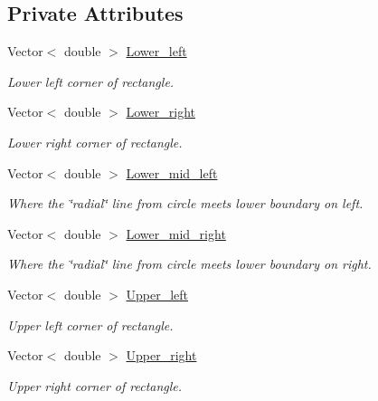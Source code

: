 \subsection*{Private Attributes}
\begin{DoxyCompactItemize}
\item 
Vector$<$ double $>$ \hyperlink{classoomph_1_1RectangleWithHoleDomain_a6926164244a3726aa904023c014e2cf0}{Lower\+\_\+left}
\begin{DoxyCompactList}\small\item\em Lower left corner of rectangle. \end{DoxyCompactList}\item 
Vector$<$ double $>$ \hyperlink{classoomph_1_1RectangleWithHoleDomain_ab71febd980c61d0c2ba0a76eca053a97}{Lower\+\_\+right}
\begin{DoxyCompactList}\small\item\em Lower right corner of rectangle. \end{DoxyCompactList}\item 
Vector$<$ double $>$ \hyperlink{classoomph_1_1RectangleWithHoleDomain_aa643600f8269e6037a76832dd0fba0f9}{Lower\+\_\+mid\+\_\+left}
\begin{DoxyCompactList}\small\item\em Where the \char`\"{}radial\char`\"{} line from circle meets lower boundary on left. \end{DoxyCompactList}\item 
Vector$<$ double $>$ \hyperlink{classoomph_1_1RectangleWithHoleDomain_a9ef86489e71e2f67eec783b460694be2}{Lower\+\_\+mid\+\_\+right}
\begin{DoxyCompactList}\small\item\em Where the \char`\"{}radial\char`\"{} line from circle meets lower boundary on right. \end{DoxyCompactList}\item 
Vector$<$ double $>$ \hyperlink{classoomph_1_1RectangleWithHoleDomain_a0e5a29a907836dace560edd72a70917d}{Upper\+\_\+left}
\begin{DoxyCompactList}\small\item\em Upper left corner of rectangle. \end{DoxyCompactList}\item 
Vector$<$ double $>$ \hyperlink{classoomph_1_1RectangleWithHoleDomain_a3bc6d59a004c8fe1b634b43b6665c9b9}{Upper\+\_\+right}
\begin{DoxyCompactList}\small\item\em Upper right corner of rectangle. \end{DoxyCompactList}\item 

\end{DoxyCompactItemize}
